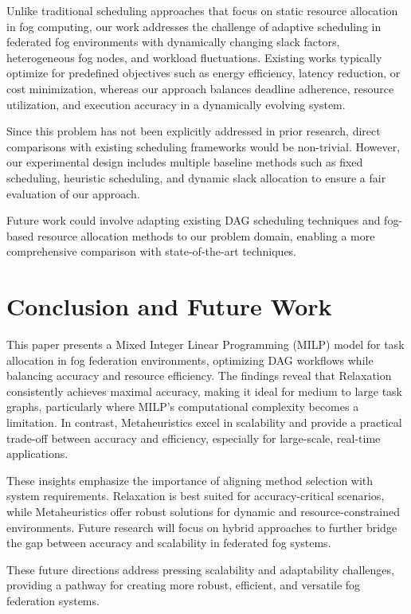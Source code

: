 \documentclass[conference]{IEEEtran}
\begin{document}
Unlike traditional scheduling approaches that focus on static resource allocation in fog computing, our work addresses the challenge of adaptive scheduling in federated fog environments with dynamically changing slack factors, heterogeneous fog nodes, and workload fluctuations. Existing works typically optimize for predefined objectives such as energy efficiency, latency reduction, or cost minimization, whereas our approach balances deadline adherence, resource utilization, and execution accuracy in a dynamically evolving system.

Since this problem has not been explicitly addressed in prior research, direct comparisons with existing scheduling frameworks would be non-trivial. However, our experimental design includes multiple baseline methods such as fixed scheduling, heuristic scheduling, and dynamic slack allocation to ensure a fair evaluation of our approach.

Future work could involve adapting existing DAG scheduling techniques and fog-based resource allocation methods to our problem domain, enabling a more comprehensive comparison with state-of-the-art techniques.

\section{Conclusion and Future Work}
 
This paper presents a Mixed Integer Linear Programming (MILP) model for task allocation in  fog federation environments, optimizing DAG workflows while balancing accuracy and resource efficiency. The findings reveal that Relaxation consistently achieves maximal accuracy, making it ideal for medium to large task graphs, particularly where MILP's computational complexity becomes a limitation. In contrast, Metaheuristics excel in scalability and provide a practical trade-off between accuracy and efficiency, especially for large-scale, real-time applications.

These insights emphasize the importance of aligning method selection with system requirements. Relaxation is best suited for accuracy-critical scenarios, while Metaheuristics offer robust solutions for dynamic and resource-constrained environments. Future research will focus on hybrid approaches to further bridge the gap between accuracy and scalability in federated fog systems.

These future directions address pressing scalability and adaptability challenges, providing a pathway for creating more robust, efficient, and versatile  fog federation systems.
\end{document}
